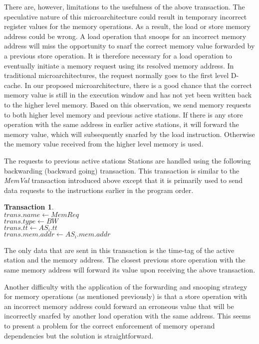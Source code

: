 \documentclass[10pt,twocolumn]{IEEEtran}
\newtheorem{trans}{Transaction}
\begin{document}
There are, however, limitations to the
usefulness of the above transaction.  The speculative nature of
this microarchitecture could result in temporary incorrect
register values for the memory operations.  As a result, the load or
store memory address could be wrong.  A load operation that snoops
for an incorrect memory address will miss the opportunity to snarf
the correct memory value forwarded by a previous store operation.
It is therefore necessary for a load operation to eventually
initiate a memory request using its resolved memory address.  In
traditional microarchitectures, the request normally goes to the
f{ir}st level D-cache.  In our proposed microarchitecture, there is
a good chance that the correct memory value is still in the
execution window and has not yet been written back to the higher
level memory.  Based on this observation, we send memory requests
to both higher level memory and previous active stations.  If
there is any store operation with the same address in earlier
active stations, it will forward the memory value, which will
subsequently snarfed by the load instruction.  Otherwise the
memory value received from the higher level memory is used.

The requests to previous active stations Stations are handled using the
following backwarding (backward going) transaction.  
This transaction is similar to
the \emph{MemVal} transaction introduced above except that 
it is primarily used to
send data requests to the instructions earlier in the program
order.
%
\begin{trans}
\mbox{} \\
\indent $trans.name \leftarrow MemReq$ \\
\indent $trans.type \leftarrow BW$ \\
\indent $trans.tt \leftarrow AS_i.tt$ \\
\indent $trans.mem.addr \leftarrow AS_i.mem.addr $
\end{trans}
%
The only data that are sent in this transaction is the 
time-tag of the active station
and the memory address.  The closest previous store operation with the same
memory address will forward its value upon receiving the above
transaction.

Another difficulty with the application of the forwarding and
snooping strategy for memory operations (as mentioned previously)
is that a store operation
with an incorrect memory address could forward an erroneous value
that will be incorrectly snarfed by another load operation with
the same address.  This seems to present a problem for the correct
enforcement of memory operand dependencies but 
the solution is straightforward.
\end{document}
